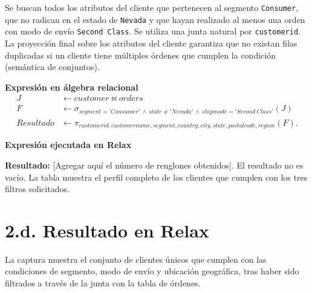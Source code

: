 Se buscan todos los atributos del cliente que pertenecen al segmento \texttt{Consumer}, que no radican en el estado de \texttt{Nevada} y que hayan realizado al menos una orden con modo de envío \texttt{Second Class}. Se utiliza una junta natural por \texttt{customerid}. La proyección final sobre los atributos del cliente garantiza que no existan filas duplicadas si un cliente tiene múltiples órdenes que cumplen la condición (semántica de conjuntos).

\textbf{Expresión en álgebra relacional}
\begin{align*}
J &\leftarrow customer \bowtie orders\\
F &\leftarrow \sigma_{segment='Consumer' \,\land\, state \neq 'Nevada' \,\land\, shipmode='Second\ Class'}(J)\\
Resultado &\leftarrow \pi_{customerid, customername, segment, country, city, state, postalcode, region}(F).
\end{align*}

\textbf{Expresión ejecutada en Relax}


\textbf{Resultado:} [Agregar aquí el número de renglones obtenidos]. El resultado no es vacío. La tabla muestra el perfil completo de los clientes que cumplen con los tres filtros solicitados.
\newpage
\section*{2.d. Resultado en Relax}
La captura muestra el conjunto de clientes únicos que cumplen con las condiciones de segmento, modo de envío y ubicación geográfica, tras haber sido filtrados a través de la junta con la tabla de órdenes.
